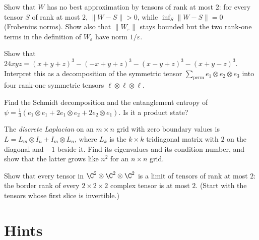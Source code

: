 \begin{exercise}[$\star$]\label{linear:ex:noapprox}
Show that $W$ has no best approximation by tensors of rank at most $2$: for every tensor $S$ of rank at most $2$, $\|W-S\|>0$, while
$\inf_S\|W-S\|=0$ (Frobenius norms). Show also that $\|W_\varepsilon\|$ stays bounded but the two rank-one terms in the definition of
$W_\varepsilon$ have norm $1/\varepsilon$.
\end{exercise}

\begin{exercise}[$\star\star$]\label{linear:ex:waring}
Show that $24xyz=(x+y+z)^3-(-x+y+z)^3-(x-y+z)^3-(x+y-z)^3$. Interpret this as a decomposition of the symmetric tensor
$\sum_{\text{perm}}e_1\otimes e_2\otimes e_3$ into four rank-one symmetric tensors $\ell\otimes\ell\otimes\ell$.
\end{exercise}

\begin{exercise}[$\star$]\label{linear:ex:schmidtcheck}
Find the Schmidt decomposition and the entanglement entropy of $\psi=\frac13(e_1\otimes e_1+2e_1\otimes e_2+2e_2\otimes e_1)$. Is it a
product state?
\end{exercise}

\begin{exercise}[$\star\star$]\label{linear:ex:gridlap}
The \emph{discrete Laplacian} on an $m\times n$ grid with zero boundary values is $L=L_m\otimes I_n+I_m\otimes L_n$, where $L_k$ is the
$k\times k$ tridiagonal matrix with $2$ on the diagonal and $-1$ beside it. Find its eigenvalues and its condition number, and show that
the latter grows like $n^2$ for an $n\times n$ grid.
\end{exercise}

\begin{exercise}[$\star\star\star$]\label{linear:ex:border}
Show that every tensor in $\C^2\otimes\C^2\otimes\C^2$ is a limit of tensors of rank at most $2$: the border rank of every
$2\times2\times2$ complex tensor is at most $2$. (Start with the tensors whose first slice is invertible.)
\end{exercise}

\section{Hints}

